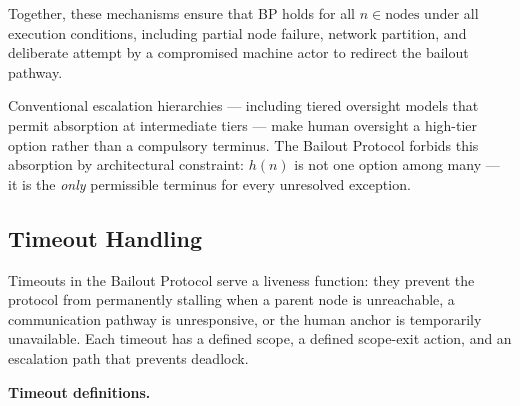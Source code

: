 Together, these mechanisms ensure that BP holds for all $n \in \text{nodes}$ under all execution conditions, including partial node failure, network partition, and deliberate attempt by a compromised machine actor to redirect the bailout pathway.

Conventional escalation hierarchies — including tiered oversight models that permit absorption at intermediate tiers — make human oversight a high-tier option rather than a compulsory terminus. The Bailout Protocol forbids this absorption by architectural constraint: $h(n)$ is not one option among many — it is the \emph{only} permissible terminus for every unresolved exception.

\subsection{Timeout Handling}\label{sec:timeout-handling}

Timeouts in the Bailout Protocol serve a liveness function: they prevent the protocol from permanently stalling when a parent node is unreachable, a communication pathway is unresponsive, or the human anchor is temporarily unavailable. Each timeout has a defined scope, a defined scope-exit action, and an escalation path that prevents deadlock.

\bigskip
\noindent\textbf{Timeout definitions.}

